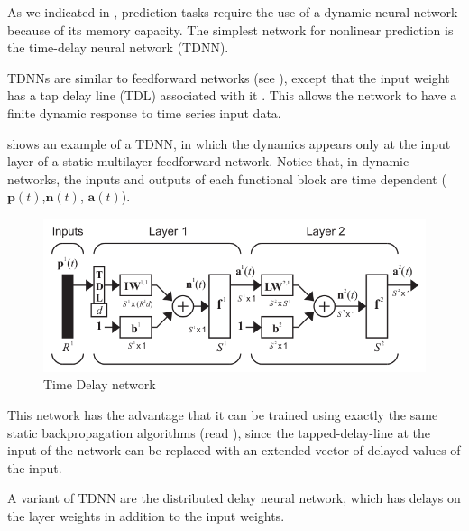 
\label{subsec:ANN:TDNN}

As we indicated in , prediction tasks
require the use of a dynamic neural network because of its memory
capacity. The simplest network for nonlinear prediction is the
time-delay neural network (TDNN).

TDNNs are similar to feedforward networks
(see ), except that the input
weight has a tap delay line (TDL) associated with
it \cite{dimith3neural}. This allows the network to have a finite
dynamic response to time series input data.

 shows an example of a TDNN, in which the dynamics appears only at the
input layer of a static multilayer feedforward network. Notice that,
in dynamic networks, the inputs and outputs of each functional block
are time dependent ($\mathbf{p}(t)$,$\mathbf{n}(t)$, $\mathbf{a}(t)$).

\begin{figure}[!ht]
\centering
\includegraphics[width=\textwidth]{images/tdnn.png}
\caption{Time Delay network}
\label{fig:tdnn}
\end{figure}

This network has the advantage that it can be trained using exactly
the same static backpropagation algorithms
(read ), since the tapped-delay-line at the
input of the network can be replaced with an extended vector of
delayed values of the input.

A variant of TDNN are the distributed delay neural network, which has
delays on the layer weights in addition to the input weights.
